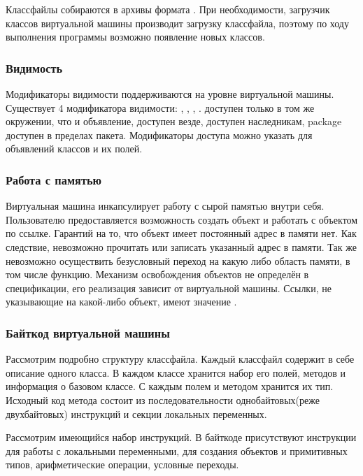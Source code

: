 Классфайлы собираются в архивы формата . При необходимости, загрузчик классов виртуальной машины производит загрузку классфайла, поэтому по ходу выполнения программы возможно появление новых классов.

\subsubsection{Видимость}
Модификаторы видимости поддерживаются на уровне виртуальной машины. Существует 4 модификатора видимости: , , , .  доступен только в том же окружении, что и объявление,  доступен везде,  доступен наследникам, package доступен в пределах пакета. Модификаторы доступа можно указать для объявлений классов и их полей.

\subsubsection{Работа с памятью}
Виртуальная машина инкапсулирует работу с сырой памятью внутри себя. Пользователю предоставляется возможность создать объект и работать с объектом по ссылке. Гарантий на то, что объект имеет постоянный адрес в памяти нет. Как следствие, невозможно прочитать или записать указанный адрес в памяти. Так же невозможно осуществить безусловный переход на какую либо область памяти, в том числе функцию. Механизм освобождения объектов не определён в спецификации, его реализация зависит от виртуальной машины. Ссылки, не указывающие на какой-либо объект, имеют значение .

\subsubsection{Байткод виртуальной машины}
Рассмотрим подробно структуру классфайла. Каждый классфайл содержит в себе описание одного класса. В каждом классе хранится набор его полей, методов и информация о базовом классе. С каждым полем и методом хранится их тип. Исходный код метода состоит из последовательности однобайтовых(реже двухбайтовых) инструкций и секции локальных переменных.

Рассмотрим имеющийся набор инструкций. В байткоде присутствуют инструкции для работы с локальными переменными, для создания объектов и примитивных типов, арифметические операции, условные переходы.

